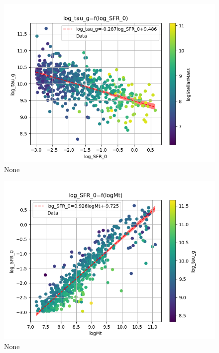 \documentclass[a4paper,twocolumn]{article}
\begin{document}
\begin{figure}[!htpb]
\centering
\includegraphics[width=.9\linewidth]{./figs/log_SFR_0-log_tau_g-color_logStellarMass.png}
\caption{\label{fig:None}None}
\end{figure}
\begin{figure}[!htpb]
\centering
\includegraphics[width=.9\linewidth]{./figs/logMt-log_SFR_0-color_log_tau_g.png}
\caption{\label{fig:None}None}
\end{figure}
\end{document}
